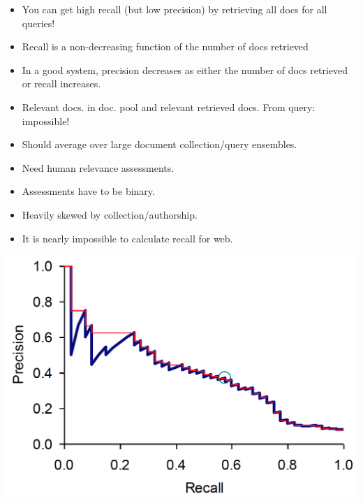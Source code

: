 \begin{breakbox}
\begin{itemize}
	\item You can get high recall (but low precision) by retrieving all docs for all queries!
	\item Recall is a non-decreasing function of the number of docs retrieved
	\item In a good system, precision decreases as either the number of docs retrieved or recall increases.
\end{itemize}
\end{breakbox}

\begin{breakbox}
\begin{itemize}
	\item Relevant docs. in doc. pool and relevant retrieved docs. From query: impossible!
	\item Should average over large document collection/query ensembles.
	\item Need human relevance assessments.
	\item Assessments have to be binary.
	\item Heavily skewed by collection/authorship.
	\item It is nearly impossible to calculate recall for web.
\end{itemize}
\end{breakbox}

\begin{breakbox}
\begin{center}
\includegraphics[width=.15\textwidth]{slides_images/precision_recall_curve}
\end{center}
\end{breakbox}

